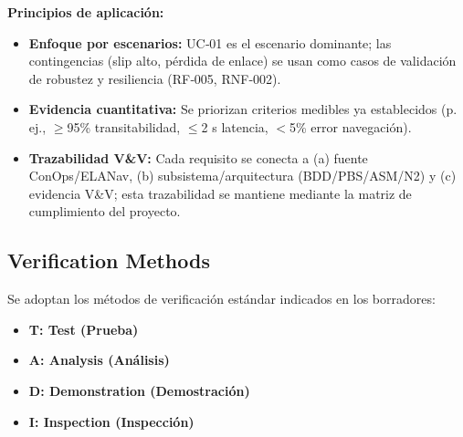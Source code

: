 \textbf{Principios de aplicación:}
\begin{itemize}
    \item \textbf{Enfoque por escenarios:} UC‑01 es el escenario dominante; las contingencias (slip alto, pérdida de enlace) se usan como casos de validación de robustez y resiliencia (RF‑005, RNF‑002).  
    \item \textbf{Evidencia cuantitativa:} Se priorizan criterios medibles ya establecidos (p. ej., $\ge$95\% transitabilidad, $\le$2 s latencia, $<$5\% error navegación).  
    \item \textbf{Trazabilidad V\&V:} Cada requisito se conecta a (a) fuente ConOps/ELANav, (b) subsistema/arquitectura (BDD/PBS/ASM/N2) y (c) evidencia V\&V; esta trazabilidad se mantiene mediante la matriz de cumplimiento del proyecto.
\end{itemize}

\subsection{Verification Methods}

Se adoptan los métodos de verificación estándar indicados en los borradores:
\begin{itemize}
    \item \textbf{T: Test (Prueba)}
    \item \textbf{A: Analysis (Análisis)}
    \item \textbf{D: Demonstration (Demostración)}
    \item \textbf{I: Inspection (Inspección)}  
\end{itemize}

